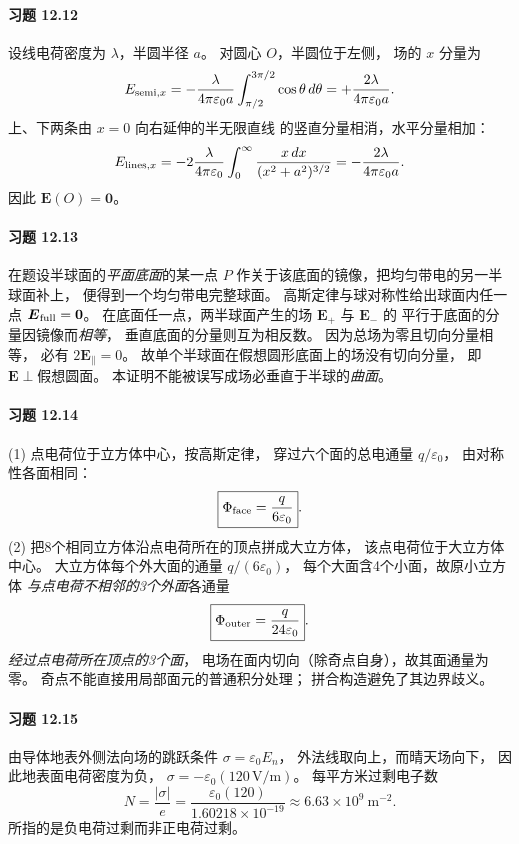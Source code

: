 \paragraph{习题 12.12}
设线电荷密度为 \(\lambda\)，半圆半径 \(a\)。
对圆心 \(O\)，半圆位于左侧，
场的 \(x\) 分量为
\[
 E_{{\rm semi},x}
 =-\frac{\lambda}{4\pi\varepsilon_0a}
 \int_{\pi/2}^{3\pi/2}\cos\theta\,d\theta
 =+\frac{2\lambda}{4\pi\varepsilon_0a}.
\]
上、下两条由 \(x=0\) 向右延伸的半无限直线
的竖直分量相消，水平分量相加：
\[
 E_{{\rm lines},x}=
 -2\frac{\lambda}{4\pi\varepsilon_0}
 \int_0^\infty\frac{x\,dx}{(x^2+a^2)^{3/2}}
 =-\frac{2\lambda}{4\pi\varepsilon_0a}.
\]
因此 \(\boxed{\boldsymbol E(O)=\boldsymbol0}\)。

\paragraph{习题 12.13}
在题设半球面的\emph{平面底面}的某一点
\(P\) 作关于该底面的镜像，把均匀带电的另一半球面补上，
便得到一个均匀带电完整球面。
高斯定律与球对称性给出球面内任一点
\(\boldsymbol E_{\rm full}=\boldsymbol0\)。
在底面任一点，两半球面产生的场
\(\boldsymbol E_+\) 与 \(\boldsymbol E_-\) 的
平行于底面的分量因镜像而\emph{相等}，
垂直底面的分量则互为相反数。
因为总场为零且切向分量相等，
必有 \(2\boldsymbol E_{\parallel}=0\)。
故单个半球面在假想圆形底面上的场没有切向分量，
即\(\boxed{\boldsymbol E\perp\text{假想圆面}}\)。
本证明不能被误写成场必垂直于半球的\emph{曲面}。

\paragraph{习题 12.14}
(1) 点电荷位于立方体中心，按高斯定律，
穿过六个面的总电通量 \(q/\varepsilon_0\)，
由对称性各面相同：
\[
 \boxed{\Phi_{\rm face}=\frac{q}{6\varepsilon_0}}.
\]
(2) 把8个相同立方体沿点电荷所在的顶点拼成大立方体，
该点电荷位于大立方体中心。
大立方体每个外大面的通量 \(q/(6\varepsilon_0)\)，
每个大面含4个小面，故原小立方体
\emph{与点电荷不相邻的3个外面}各通量
\[
 \boxed{\Phi_{\rm outer}=\frac{q}{24\varepsilon_0}}.
\]
\emph{经过点电荷所在顶点的3个面}，
电场在面内切向（除奇点自身），故其面通量为零。
奇点不能直接用局部面元的普通积分处理；
拼合构造避免了其边界歧义。

\paragraph{习题 12.15}
由导体地表外侧法向场的跳跃条件
\(\sigma=\varepsilon_0E_n\)，
外法线取向上，而晴天场向下，
因此地表面电荷密度为负，
\(\sigma=-\varepsilon_0(120\,\mathrm{V/m})\)。
每平方米过剩电子数
\[
 \boxed{N=\frac{|\sigma|}{e}
 =\frac{\varepsilon_0(120)}{1.60218\times10^{-19}}
 \approx6.63\times10^9\ \mathrm{m^{-2}}}.
\]
所指的是负电荷过剩而非正电荷过剩。

